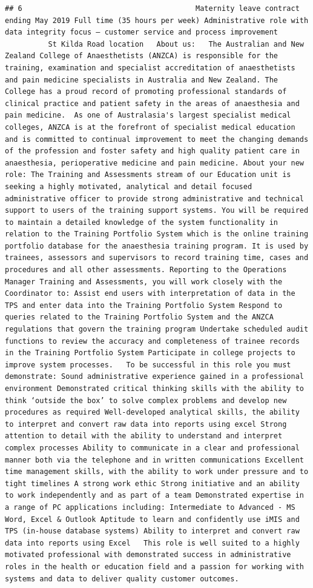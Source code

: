 \documentclass[11pt,a4paper,]{article}
\begin{document}
\begin{verbatim}
## 6                                        Maternity leave contract ending May 2019 Full time (35 hours per week) Administrative role with data integrity focus – customer service and process improvement           St Kilda Road location   About us:   The Australian and New Zealand College of Anaesthetists (ANZCA) is responsible for the training, examination and specialist accreditation of anaesthetists and pain medicine specialists in Australia and New Zealand. The College has a proud record of promoting professional standards of clinical practice and patient safety in the areas of anaesthesia and pain medicine.  As one of Australasia's largest specialist medical colleges, ANZCA is at the forefront of specialist medical education and is committed to continual improvement to meet the changing demands of the profession and foster safety and high quality patient care in anaesthesia, perioperative medicine and pain medicine. About your new role: The Training and Assessments stream of our Education unit is seeking a highly motivated, analytical and detail focused administrative officer to provide strong administrative and technical support to users of the training support systems. You will be required to maintain a detailed knowledge of the system functionality in relation to the Training Portfolio System which is the online training portfolio database for the anaesthesia training program. It is used by trainees, assessors and supervisors to record training time, cases and procedures and all other assessments. Reporting to the Operations Manager Training and Assessments, you will work closely with the Coordinator to: Assist end users with interpretation of data in the TPS and enter data into the Training Portfolio System Respond to queries related to the Training Portfolio System and the ANZCA regulations that govern the training program Undertake scheduled audit functions to review the accuracy and completeness of trainee records in the Training Portfolio System Participate in college projects to improve system processes.   To be successful in this role you must demonstrate: Sound administrative experience gained in a professional environment Demonstrated critical thinking skills with the ability to think ‘outside the box’ to solve complex problems and develop new procedures as required Well-developed analytical skills, the ability to interpret and convert raw data into reports using excel Strong attention to detail with the ability to understand and interpret complex processes Ability to communicate in a clear and professional manner both via the telephone and in written communications Excellent time management skills, with the ability to work under pressure and to tight timelines A strong work ethic Strong initiative and an ability to work independently and as part of a team Demonstrated expertise in a range of PC applications including: Intermediate to Advanced - MS Word, Excel & Outlook Aptitude to learn and confidently use iMIS and TPS (in-house database systems) Ability to interpret and convert raw data into reports using Excel   This role is well suited to a highly motivated professional with demonstrated success in administrative roles in the health or education field and a passion for working with systems and data to deliver quality customer outcomes. 
\end{verbatim}
\end{document}
